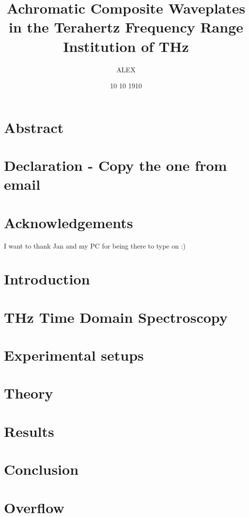 \documentclass[12pt, a4paper]{report}
\title{
{Achromatic Composite Waveplates in the Terahertz Frequency Range}\\
{\large Institution of THz}\\
}
\author{ALEX}
\date{10 10 1910}
\begin{document}
\maketitle

\chapter*{Abstract}


\chapter*{Declaration - Copy the one from email} %

\chapter*{Acknowledgements}
I want to thank Jan and my PC for being there to type on :)

\tableofcontents %



\chapter{Introduction}

\chapter{THz Time Domain Spectroscopy}

\chapter{Experimental setups}

\chapter{Theory}

\chapter{Results}

\chapter{Conclusion}

\appendix
\chapter{Overflow}

\sloppy
\printbibliography %

\end{document}
